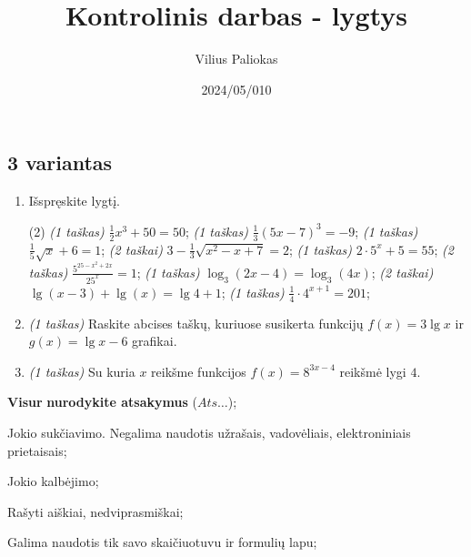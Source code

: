 \documentclass[a4paper]{article}
\title{Kontrolinis darbas - lygtys}
\author{Vilius Paliokas}
\date{2024/05/010}
\begin{document}
\thispagestyle{fancy}

\titlespacing*{\subsection}{0pt}{.75ex}{0.75ex}

\subsection*{3 variantas}

\begin{enumerate}
      \item Išspręskite lygtį.
            \begin{tasks}[item-format={\normalfont}, after-item-skip=2mm](2)
                  \task \textit{(1 taškas)} $\frac{1}{2}x^3+{50}=50$;
                  \task \textit{(1 taškas)} $\frac{1}{3}(5x-7)^3=-9$;
                  \task \textit{(1 taškas)} $\frac{1}{5}\sqrt{x}+6=1$;
                  \task \textit{(2 taškai)} $3-\frac{1}{3}\sqrt{x^2-x+7}=2$;
                  \task \textit{(1 taškas)} $2\cdot5^x+5=55$;
                  \task \textit{(2 taškas)} $\frac{5^{25-x^2+2x}}{25^x}=1$;
                  \task \textit{(1 taškas)} $\log_3(2x-4)=\log_3(4x)$;
                  \task \textit{(2 taškai)} $\lg(x-3)+\lg(x)=\lg4+1$;
                  \task \textit{(1 taškas)} $\frac{1}{4}\cdot 4^{x+1}=201$;
            \end{tasks}
      \item \textit{(1 taškas)} Raskite abcises taškų, kuriuose susikerta funkcijų $f(x)=3\lg{x}$ ir $g(x)=\lg{x}-6$ grafikai.
      \item \textit{(1 taškas)} Su kuria $x$ reikšme funkcijos $f(x)=8^{3x-4}$ reikšmė lygi $4$.
\end{enumerate}

\begin{small}
      \begin{enumerate*}[label={(\arabic*)}]
            \item \textbf{Visur} \textbf{nurodykite atsakymus} ($Ats\ldots$);
            \item Jokio sukčiavimo. Negalima naudotis užrašais, vadovėliais,
            elektroniniais prietaisais;
            \item Jokio kalbėjimo;
            \item Rašyti aiškiai, nedviprasmiškai;
            \item Galima naudotis tik savo skaičiuotuvu ir formulių lapu;
      \end{enumerate*}
\end{small}
\end{document}
